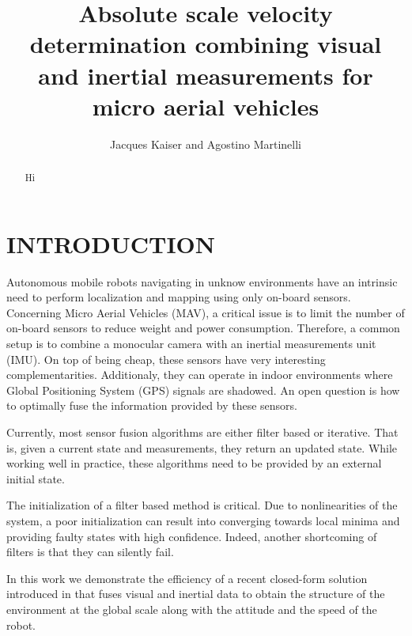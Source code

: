 \documentclass[letterpaper, 10 pt, conference]{ieeeconf}  %
\title{\LARGE \bf
Absolute scale velocity determination combining visual and inertial measurements for micro aerial vehicles
}
\author{Jacques Kaiser and Agostino Martinelli%
}
\begin{document}
\maketitle
\thispagestyle{empty}
\pagestyle{empty}


\begin{abstract}

Hi

\end{abstract}



\section{INTRODUCTION}




Autonomous mobile robots navigating in unknow environments have an intrinsic need to perform localization and mapping using only on-board sensors.
Concerning Micro Aerial Vehicles (MAV), a critical issue is to limit the number of on-board sensors to reduce weight and power consumption.
Therefore, a common setup is to combine a monocular camera with an inertial measurements unit (IMU).
On top of being cheap, these sensors have very interesting complementarities.
Additionaly, they can operate in indoor environments where Global Positioning System (GPS) signals are shadowed.
An open question is how to optimally fuse the information provided by these sensors.

Currently, most sensor fusion algorithms are either filter based or iterative. That is, given a current state and measurements, they return an updated state.
While working well in practice, these algorithms need to be provided by an external initial state.

The initialization of a filter based method is critical.
Due to nonlinearities of the system, a poor initialization can result into converging towards local minima and  providing faulty states with high confidence.
Indeed, another shortcoming of filters is that they can silently fail.

In this work we demonstrate the efficiency of a recent closed-form solution introduced in \cite{Martinelli2012}\cite{Martinelli2014} that fuses visual and inertial data to obtain the structure of the environment at the global scale along with the attitude and the speed of the robot.
\end{document}
